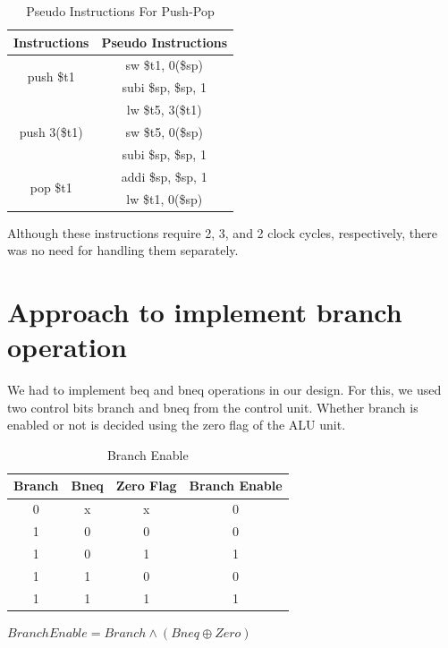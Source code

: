 \documentclass[12]{article}
\begin{document}
\begin{table}[!h]
    \centering
    \begin{tabular}{|c|c|}
        \hline
        Instructions & Pseudo Instructions \\ 
        \hline
        \multirow{2}{*}{push \$t1} & sw \$t1, 0(\$sp) \\
         & subi \$sp, \$sp, 1 \\ 
         \hline
         \multirow{3}{*}{push 3(\$t1)} & lw \$t5, 3(\$t1) \\
        & sw \$t5, 0(\$sp) \\
        & subi \$sp, \$sp, 1 \\ 
        \hline 
        \multirow{2}{*}{pop \$t1} & addi \$sp, \$sp, 1 \\
        & lw \$t1, 0(\$sp) \\ 
        \hline
    \end{tabular}
    \caption{Pseudo Instructions For Push-Pop}
    \label{tab:3}
\end{table}

Although these instructions require 2, 3, and 2 clock cycles, respectively, there was no need for handling them separately.

\section{Approach to implement branch operation}

We had to implement beq and bneq operations in our design. For this, we used two control bits branch and bneq from the control unit. Whether branch is enabled or not is decided using the zero flag of the ALU unit.

\begin{table}[!h]
    \centering
    \begin{tabular}{|c|c|c|c|}
         \hline
        Branch & Bneq & Zero Flag & Branch Enable \\ \hline
         0 & x & x & 0 \\ \hline
         1 & 0 & 0 & 0 \\ \hline
         1 & 0 & 1 & 1 \\ \hline
         1 & 1 & 0 & 0 \\ \hline
         1 & 1 & 1 & 1 \\ \hline
         \hline
    \end{tabular}
    \caption{Branch Enable}
    \label{tab:BEN}
\end{table}
\raggedright
$Branch Enable = Branch \land ( Bneq \oplus Zero  )$
\end{document}
